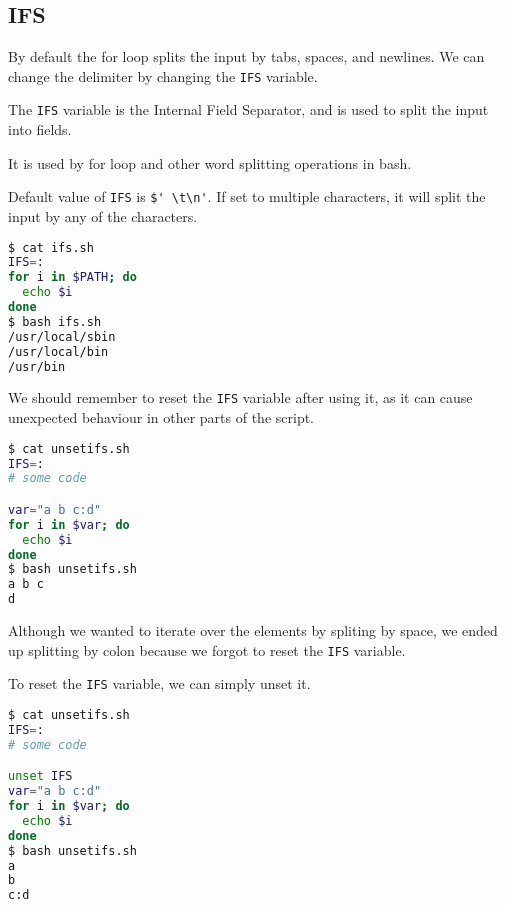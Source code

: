 \subsection{IFS}

By default the for loop splits the input by tabs, spaces, and newlines. We can change the delimiter by changing the \lstinline|IFS| variable.

\begin{definition}[IFS]
  The \lstinline|IFS| variable is the Internal Field Separator, and is used to split the input into fields.
\end{definition}

It is used by for loop and other word splitting operations in bash.

Default value of \lstinline|IFS| is \lstinline|$' \t\n'|.
If set to multiple characters, it will split the input by any of the characters.

\begin{lstlisting}[language=bash]
$ cat ifs.sh
IFS=:
for i in $PATH; do
  echo $i
done
$ bash ifs.sh
/usr/local/sbin
/usr/local/bin
/usr/bin
\end{lstlisting}

We should remember to reset the \lstinline|IFS| variable after using it, as it can cause unexpected behaviour in other parts of the script.

\begin{lstlisting}[language=bash]
$ cat unsetifs.sh
IFS=:
# some code

var="a b c:d"
for i in $var; do
  echo $i
done
$ bash unsetifs.sh
a b c
d
\end{lstlisting}

Although we wanted to iterate over the elements by spliting by space, we ended up splitting by colon because we forgot to reset the \lstinline|IFS| variable.

To reset the \lstinline|IFS| variable, we can simply unset it.

\begin{lstlisting}[language=bash]
$ cat unsetifs.sh
IFS=:
# some code

unset IFS
var="a b c:d"
for i in $var; do
  echo $i
done
$ bash unsetifs.sh
a
b
c:d
\end{lstlisting}

